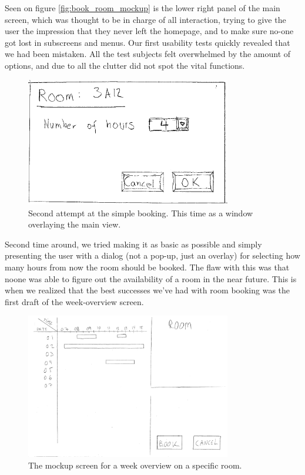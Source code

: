 Seen on figure \ref{fig:book_room_mockup} is the lower right panel of the main screen, which was thought to be in charge of all interaction, trying to give the user the impression that they never left the homepage, and to make sure no-one got lost in subscreens and menus. Our first usability tests quickly revealed that we had been mistaken. All the test subjects felt overwhelmed by the amount of options, and due to all the clutter did not spot the vital functions.

\begin{figure}[htb]
\begin{center}
\leavevmode
\includegraphics[width=0.8\textwidth]{images/bookRoomMockup2}
\end{center}
\caption{Second attempt at the simple booking. This time as a window overlaying the main view.}
\label{fig:book_room_mockup2}
\end{figure}

Second time around, we tried making it as basic as possible and simply presenting the user with a dialog (not a pop-up, just an overlay) for selecting how many hours from now the room should be booked. The flaw with this was that noone was able to figure out the availability of a room in the near future. This is when we realized that the best successes we've had with room booking was the first draft of the week-overview screen.

\begin{figure}[htb]
\begin{center}
\leavevmode
\includegraphics[width=0.8\textwidth]{images/weekMockup}
\end{center}
\caption{The mockup screen for a week overview on a specific room.}
\label{fig:week_mockup}
\end{figure}

